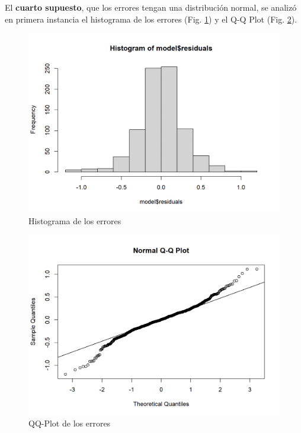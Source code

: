 \documentclass[a4paper,10pt,twocolumn]{article}
\begin{document}
El \textbf{cuarto supuesto}, que los errores tengan una distribución normal, se analizó en primera instancia el histograma de los errores (Fig. \ref{fig:reg_his}) y el Q-Q Plot (Fig. \ref{fig:reg_qq}).

\begin{figure}[htb]%
	\begin{center}
		\includegraphics[width=\linewidth]{reg_his}
	\end{center}
	\caption{Histograma de los errores \label{fig:reg_his}}%
\end{figure}

\begin{figure}[htb]%
	\begin{center}
		\includegraphics[width=\linewidth]{reg_qq}
	\end{center}
	\caption{QQ-Plot de los errores \label{fig:reg_qq}}%
\end{figure}
\end{document}
